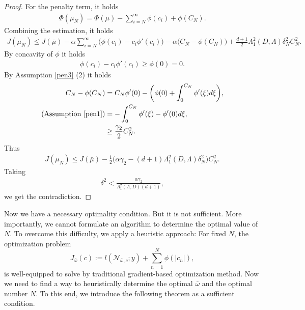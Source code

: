 \documentclass[12pt,fleqn]{amsart}
\theoremstyle{definition}
\begin{document}
\begin{proof}
For the penalty term, it holds
\begin{align*}
	\Phi(\mu_N) = \Phi(\mu) - \sum_{i = N}^\infty \phi(c_i) + \phi(C_N). 
\end{align*}
Combining the estimation, it holds
\begin{align*}
	J(\mu_N) \le J(\bar{\mu}) - \alpha \sum_{i = N}^\infty \bigg(\phi(c_i) - c_i \phi'(c_i) \bigg) - \alpha\bigg(C_N  - \phi(C_N) \bigg) + \frac{d + 1}{2} \Lambda_1^2(D, \Lambda) \delta_N^2 C_N^2.
\end{align*}
By concavity of $\phi$ it holds
\begin{align*}
	\phi(c_i) - c_i \phi'(c_i) \ge \phi(0) = 0.
\end{align*}
By Assumption \ref{pen3} (2) it holds
\begin{align*}
	C_N - \phi(C_N) &= C_N \phi'(0) - \bigg(\phi(0) + \int_0^{C_N} \phi'(\xi) d\xi \bigg), \\
	(\text{Assumption \ref{pen1}} )
	& = -\int_0^{C_N}\phi'(\xi) - \phi'(0) d\xi, \\
	& \ge \frac{\gamma_2}{2}C_N^2.
\end{align*}
Thus
\begin{align*}
	J(\mu_N) \le J(\bar{\mu}) - \frac{1}{2}\bigg(\alpha \gamma_2 -(d + 1) \Lambda_1^2(D, \Lambda)\delta_N^2 \bigg)C_N^2.
\end{align*}
Taking 
\begin{align*}
	\delta^2 < \frac{\alpha \gamma_2}{\Lambda_1^2(\Lambda, D)(d + 1)},
\end{align*}
we get the contradiction.
\end{proof}

Now we have a necessary optimality condition. But it is not sufficient. More importantly, we cannot formulate an algorithm to determine the optimal value of $N$. To overcome this difficulty, we apply a heuristic approach: For fixed $N$, the optimization problem
\begin{equation}\label{opt_fixN}
	J_{\bar{\omega}}(c):= l(\mathcal{N}_{\bar{\omega}, c}; y) + \sum_{n = 1}^N \phi(|c_n|),
\end{equation}
is well-equipped to solve by traditional gradient-based optimization method. Now we need to find a way to heuristically determine the optimal $\bar{\omega}$ and the optimal number $N$. To this end, we introduce the following theorem as a sufficient condition. 
\end{document}
